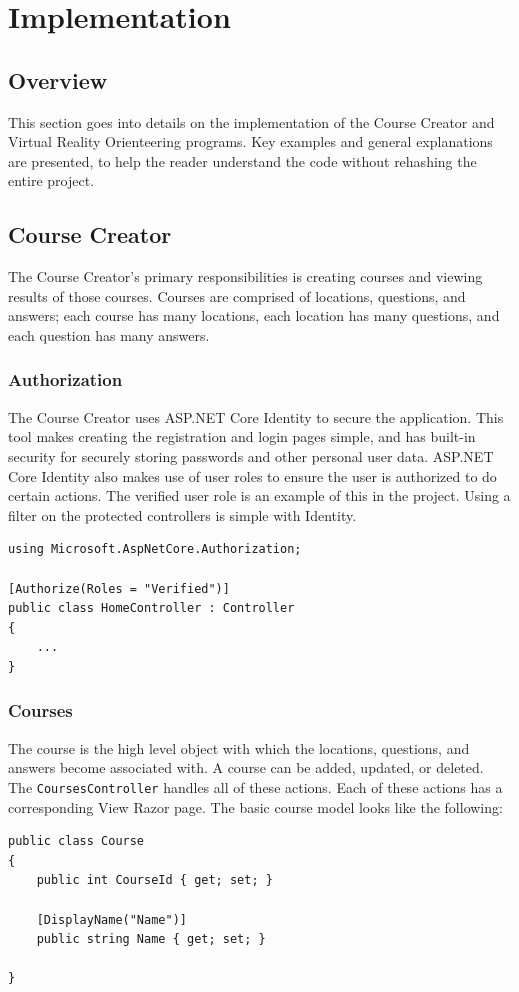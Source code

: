 \section{Implementation}																	
\label{sec:Implementation}

\subsection{Overview} 
This section goes into details on the implementation of the Course Creator and Virtual Reality Orienteering programs. Key examples and general explanations are presented, to help the reader understand the code without rehashing the entire project. 

\subsection{Course Creator}
The Course Creator's primary responsibilities is creating courses and viewing results of those courses. Courses are comprised of locations, questions, and answers; each course has many locations, each location has many questions, and each question has many answers. 

\subsubsection{Authorization}
The Course Creator uses ASP.NET Core Identity to secure the application. This tool makes creating the registration and login pages simple, and has built-in security for securely storing passwords and other personal user data. ASP.NET Core Identity also makes use of user roles to ensure the user is authorized to do certain actions. The verified user role is an example of this in the project. Using a filter on the protected controllers is simple with Identity.
\begin{lstlisting}[caption=Securing Controllers using Filter on User Role, label=lst:FilterUserRole]
using Microsoft.AspNetCore.Authorization;

[Authorize(Roles = "Verified")]
public class HomeController : Controller
{
	...
}
\end{lstlisting} 
\subsubsection{Courses}
The course is the high level object with which the locations, questions, and answers become associated with. A course can be added, updated, or deleted. The \lstinline{CoursesController} handles all of these actions. Each of these actions has a corresponding View Razor page. The basic course model looks like the following:
\begin{lstlisting}[caption=Course Model, label=lst:CourseModel]
public class Course
{
	public int CourseId { get; set; }
	
	[DisplayName("Name")]
	public string Name { get; set; }

}
\end{lstlisting}
 
